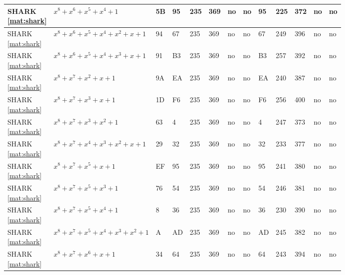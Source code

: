 \begin{tiny}
\begin{longtable}{|l|l|l|l|l|l|l|l|l|l|l|l|l|}
\shortstack{SHARK \\ \eqref{mat:shark}} & $x^8 + x^6 + x^5 + x^4 + 1$ & 5B & 95 & 235 & 369 & no & no & 95 & 225 & 372 & no & no \\ \hline
\shortstack{SHARK \\ \eqref{mat:shark}} & $x^8 + x^6 + x^5 + x^4 + x^2 + x + 1$ & 94 & 67 & 235 & 369 & no & no & 67 & 249 & 396 & no & no \\ \hline
\shortstack{SHARK \\ \eqref{mat:shark}} & $x^8 + x^6 + x^5 + x^4 + x^3 + x + 1$ & 91 & B3 & 235 & 369 & no & no & B3 & 257 & 392 & no & no \\ \hline
\shortstack{SHARK \\ \eqref{mat:shark}} & $x^8 + x^7 + x^2 + x + 1$ & 9A & EA & 235 & 369 & no & no & EA & 240 & 387 & no & no \\ \hline
\shortstack{SHARK \\ \eqref{mat:shark}} & $x^8 + x^7 + x^3 + x + 1$ & 1D & F6 & 235 & 369 & no & no & F6 & 256 & 400 & no & no \\ \hline
\shortstack{SHARK \\ \eqref{mat:shark}} & $x^8 + x^7 + x^3 + x^2 + 1$ & 63 & 4 & 235 & 369 & no & no & 4 & 247 & 373 & no & no \\ \hline
\shortstack{SHARK \\ \eqref{mat:shark}} & $x^8 + x^7 + x^4 + x^3 + x^2 + x + 1$ & 29 & 32 & 235 & 369 & no & no & 32 & 233 & 377 & no & no \\ \hline
\shortstack{SHARK \\ \eqref{mat:shark}} & $x^8 + x^7 + x^5 + x + 1$ & EF & 95 & 235 & 369 & no & no & 95 & 241 & 380 & no & no \\ \hline
\shortstack{SHARK \\ \eqref{mat:shark}} & $x^8 + x^7 + x^5 + x^3 + 1$ & 76 & 54 & 235 & 369 & no & no & 54 & 246 & 381 & no & no \\ \hline
\shortstack{SHARK \\ \eqref{mat:shark}} & $x^8 + x^7 + x^5 + x^4 + 1$ & 8 & 36 & 235 & 369 & no & no & 36 & 230 & 390 & no & no \\ \hline
\shortstack{SHARK \\ \eqref{mat:shark}} & $x^8 + x^7 + x^5 + x^4 + x^3 + x^2 + 1$ & A & AD & 235 & 369 & no & no & AD & 245 & 382 & no & no \\ \hline
\shortstack{SHARK \\ \eqref{mat:shark}} & $x^8 + x^7 + x^6 + x + 1$ & 34 & 64 & 235 & 369 & no & no & 64 & 243 & 394 & no & no \\ \hline

\end{longtable}
\end{tiny}
